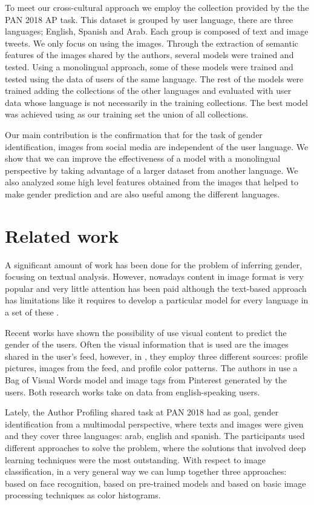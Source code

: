 \documentclass[runningheads]{llncs}
\begin{document}
To meet our cross-cultural approach
we employ the collection provided by the 
the PAN 2018 AP task. This dataset is 
grouped by user language, there are three
languages; English, Spanish and Arab. Each
group is composed of text and image tweets.
We only focus on using the images. Through the extraction of semantic features of 
the images shared by the authors, several models
were trained and tested. Using a monolingual approach, some of these models
were trained and tested using the data of users
of the same language. The rest of the models 
were trained adding the collections of the 
other languages and evaluated with user data 
whose language is not necessarily in the 
training collections. The best model was achieved using as our training set the union of all 
collections. 

Our main contribution is the confirmation 
that for the task of gender identification, 
images from social media are independent
of the user language. We show that we can improve the effectiveness of a model with a monolingual perspective by taking advantage of a larger dataset from another language. We also analyzed some high level features obtained from the images that helped to make gender prediction and are also useful among the different languages.

\section{Related work}

A significant amount of work has been done for the problem of inferring gender, focusing on
textual analysis. However, nowadays content in image format is very popular and 
very little attention has been paid although the text-based approach has limitations like it requires to develop a particular model for every language in a set of these \cite{ciot2013gender}.

Recent works have shown the possibility of use visual content
to predict the gender of the users. 
Often the visual information that is used are the images shared in the user's feed, 
however, in \cite{merler2015you}, they employ three different sources: profile pictures, images from the feed,
and profile color patterns.
The authors in \cite{you2016picture} use a Bag of Visual Words model
and image tags from Pinterest generated by the users. Both research works
take on data from english-speaking users.

Lately, the Author Profiling shared task at PAN 2018 had as goal, 
gender identification from a multimodal perspective, where texts and images were 
given and they cover three languages: arab, english and spanish.
The participants used different approaches to solve the problem,
where the solutions that involved deep learning techniques were the most outstanding.
With respect to image classification, in a very general way we can lump
together three approaches: based on face recognition, based on pre-trained models
and based on basic image processing techniques as color histograms.
\end{document}
